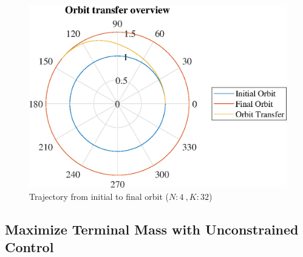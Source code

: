 \documentclass[]{article}
\begin{document}
	\begin{figure}
		\centering
		\includegraphics[scale=0.75]{orbit_N4_K32_C2_tf.eps}
		\caption{Trajectory from initial to final orbit (\(N:4\ , K:32\))}
		\label{fig:orbit_N4_K32_C2_tf}
	\end{figure}
	
	\FloatBarrier
	\subsection{Maximize Terminal Mass with Unconstrained Control}
	
\end{document}
